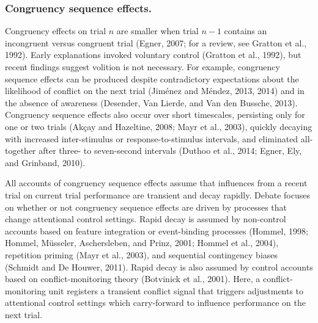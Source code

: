 \documentclass[]{DissertateCUNY}
\begin{document}
\hypertarget{congruency-sequence-effects.}{%
\subsubsection{Congruency sequence
effects.}\label{congruency-sequence-effects.}}

Congruency effects on trial \(n\) are smaller when trial \(n-1\)
contains an incongruent versus congruent trial (Egner, 2007; for a
review, see Gratton et al., 1992). Early explanations invoked voluntary
control (Gratton et al., 1992), but recent findings suggest volition is
not necessary. For example, congruency sequence effects can be produced
despite contradictory expectations about the likelihood of conflict on
the next trial (Jiménez and Méndez, 2013, 2014) and in the absence of
awareness (Desender, Van Lierde, and Van den Bussche, 2013). Congruency
sequence effects also occur over short timescales, persisting only for
one or two trials (Akçay and Hazeltine, 2008; Mayr et al., 2003),
quickly decaying with increased inter-stimulus or response-to-stimulus
intervals, and eliminated all-together after three- to seven-second
intervals (Duthoo et al., 2014; Egner, Ely, and Grinband, 2010).

All accounts of congruency sequence effects assume that influences from
a recent trial on current trial performance are transient and decay
rapidly. Debate focuses on whether or not congruency sequence effects
are driven by processes that change attentional control settings. Rapid
decay is assumed by non-control accounts based on feature integration or
event-binding processes (Hommel, 1998; Hommel, Müsseler, Aschersleben,
and Prinz, 2001; Hommel et al., 2004), repetition priming (Mayr et al.,
2003), and sequential contingency biases (Schmidt and De Houwer, 2011).
Rapid decay is also assumed by control accounts based on
conflict-monitoring theory (Botvinick et al., 2001). Here, a
conflict-monitoring unit registers a transient conflict signal that
triggers adjustments to attentional control settings which carry-forward
to influence performance on the next trial.
\end{document}
